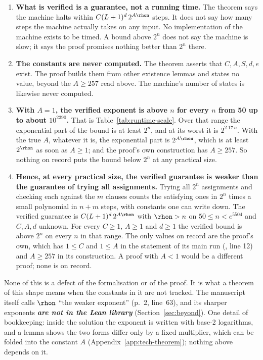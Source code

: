 \begin{enumerate}
\item \textbf{What is verified is a guarantee, not a running time.} The
  theorem says the machine halts within $C(L+1)^d\,2^{A\rhon}$ steps.
  It does not say how many steps the machine actually takes on any
  input. No implementation of the machine exists to be timed. A bound
  above $2^n$ does not say the machine is slow; it says the proof
  promises nothing better than $2^n$ there.
\item \textbf{The constants are never computed.} The theorem asserts
  that $C, A, S, d, e$ exist. The proof builds them from other
  existence lemmas and states no value, beyond the $A \ge 257$ read
  above. The machine's number of states is likewise never computed.
\item \textbf{With $A = 1$, the verified exponent is above $n$ for every
  $n$ from 50 up to about $10^{2390}$.} That is
  Table~\ref{tab:runtime-scale}. Over that range the exponential part
  of the bound is at least $2^n$, and at its worst it is $2^{2.17\,n}$.
  With the true $A$, whatever it is, the exponential part is $2^{A\rhon}$,
  which is at least $2^{\rhon}$ as soon as $A \ge 1$; and the proof's
  own construction has $A \ge 257$. So nothing on record puts the bound
  below $2^n$ at any practical size.
\item \textbf{Hence, at every practical size, the verified guarantee is
  weaker than the guarantee of trying all assignments.} Trying all
  $2^n$ assignments and checking each against the $m$ clauses counts
  the satisfying ones in $2^n$ times a small polynomial in $n + m$
  steps, with constants one can write down. The verified guarantee is
  $C(L+1)^d\,2^{A\rhon}$ with $\rhon > n$ on $50 \le n < e^{5504}$ and
  $C, A, d$ unknown. For every $C \ge 1$, $A \ge 1$ and $d \ge 1$ the
  verified bound is above $2^n$ on every $n$ in that range. The only
  values on record are the proof's own, which has $1 \le C$ and
  $1 \le A$ in the statement of its main run
  (, line 12) and
  $A \ge 257$ in its construction. A proof with $A < 1$ would be a
  different proof; none is on record.
\end{enumerate}

None of this is a defect of the formalisation or of the proof. It is
what a theorem of this shape means when the constants in it are not
tracked. The manuscript itself calls $\rhon$ ``the weaker exponent''
(p.~2, line~63), and its sharper exponents \textbf{\emph{are not in the Lean library}}
(Section~\ref{sec:beyond}). One detail of bookkeeping: inside the
solution the exponent is written with base-2 logarithms, and a lemma shows the two forms differ only by a fixed multiplier, which can be folded into the constant $A$ (Appendix~\ref{app:tech-theorem}); nothing above depends on it.

